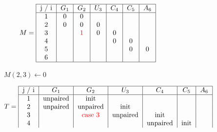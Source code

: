 \begin{figure}[H]
    \centering
    \begin{subfigure}[t]{0.25\textwidth}
        \scriptsize \[
                        M =  \begin{tabular}{|c|c|c|c|c|c|c|}
                                 \hline
                                 j / i & $G_1$ & $G_2$              & $U_3$ & $C_4$ & $C_5$ & $A_6$ \\ \hline
                                 1     & 0     & 0                  &       &       &       &       \\
                                 2     & 0     & 0                  & 0     &       &       &       \\
                                 3     &       & \textcolor{red}{1} & 0     & 0     &       &       \\
                                 4     &       &                    &       & 0     & 0     &       \\
                                 5     &       &                    &       &       & 0     & 0     \\
                                 6     &       &                    &       &       &       &       \\ \hline
                        \end{tabular}
        \]
        \caption{$M(2,3) \gets 0$}
    \end{subfigure}
    \hfill
    \begin{subfigure}[t]{0.65\textwidth}
        \scriptsize \[
                        T =     \begin{tabular}{|c|c|c|c|c|c|c|}
                                    \hline
                                    j / i & $G_1$    & $G_2$                   & $U_3$    & $C_4$    & $C_5$    & $A_6$ \\ \hline
                                    1     & unpaired & init                    &          &          &          &       \\
                                    2     & unpaired & unpaired                & init     &          &          &       \\
                                    3     &          & \textcolor{red}{case 3} & unpaired & init     &          &       \\
                                    4     &          &                         &          & unpaired & init     &       \\

\end{tabular}\]
\end{subfigure}
\end{figure}

